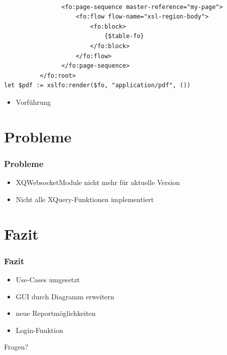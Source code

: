 \documentclass{beamer}
\begin{document}
\begin{frame}[fragile]
\begin{lstlisting}                
                
                <fo:page-sequence master-reference="my-page">
                    <fo:flow flow-name="xsl-region-body">
                        <fo:block>
                            {$table-fo}
                        </fo:block>
                    </fo:flow>
                </fo:page-sequence>
          </fo:root>
let $pdf := xslfo:render($fo, "application/pdf", ())
\end{lstlisting}
\end{frame}

\begin{frame}
\begin{itemize}
\item Vorführung
\end{itemize}
\end{frame}

\section{Probleme}
\begin{frame}
\frametitle{Probleme}
\begin{itemize}
	\item XQWebsocketModule nicht mehr für aktuelle Version
	\item Nicht alle XQuery-Funktionen implementiert
\end{itemize}
\end{frame}

\section{Fazit}
\begin{frame}
\frametitle{Fazit}
\begin{itemize}
	\item Use-Cases umgesetzt
	\item GUI durch Diagramm erweitern
	\item neue Reportmöglichkeiten
	\item Login-Funktion
\end{itemize}
\end{frame}

\begin{frame}
\begin{center}
\Huge Fragen?
\end{center}

\end{frame}
\end{document}
